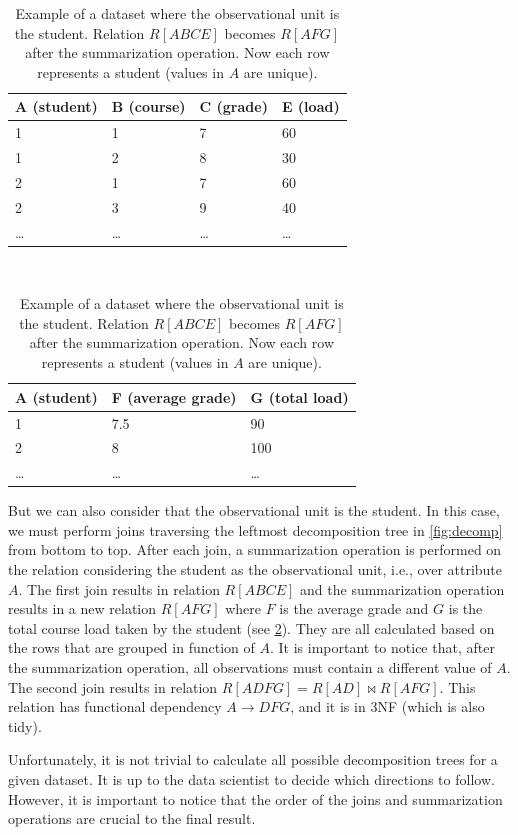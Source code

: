 \begin{table}
  \centering
  \begin{tabular}{llll}
    \toprule
    \textbf{A (student)} & \textbf{B (course)} & \textbf{C (grade)} & \textbf{E (load)} \\
    \midrule
    1 & 1 & 7 & 60 \\
    1 & 2 & 8 & 30 \\
    2 & 1 & 7 & 60 \\
    2 & 3 & 9 & 40 \\
    \dots & \dots & \dots & \dots \\
    \bottomrule
  \end{tabular}
  \\[1em]
  \begin{tabular}{lll}
    \toprule
    \textbf{A (student)} & \textbf{F (average grade)} & \textbf{G (total load)} \\
    \midrule
    1 & 7.5 & 90 \\
    2 & 8 & 100 \\
    \dots & \dots & \dots \\
    \bottomrule
  \end{tabular}
  \caption{
  Example of a dataset where the observational unit is the student.
  Relation $R[ABCE]$ becomes $R[AFG]$ after the summarization operation.  Now each row
  represents a student (values in $A$ are unique).
  }
  \label{tab:student}
\end{table}

But we can also consider that the observational unit is the student.  In this case, we
must perform joins traversing the leftmost decomposition tree in \cref{fig:decomp} from
bottom to top.  After each join, a summarization operation is performed on the relation
considering the student as the observational unit, i.e., over attribute $A$.  The first
join results in relation $R[ABCE]$ and the summarization operation results in a new
relation $R[AFG]$ where $F$ is the average grade and $G$ is the total course load taken by
the student (see \cref{tab:student}).  They are all calculated based on the rows that are grouped in function of $A$.
It is important to notice that, after the summarization operation, all observations must
contain a different value of $A$.  The second join results in relation $R[ADFG] = R[AD]
\bowtie R[AFG]$.  This relation has functional dependency $A \to DFG$, and it is in 3NF
(which is also tidy).

Unfortunately, it is not trivial to calculate all possible decomposition trees for a given
dataset.  It is up to the data scientist to decide which directions to follow.  However,
it is important to notice that the order of the joins and summarization operations are
crucial to the final result.

